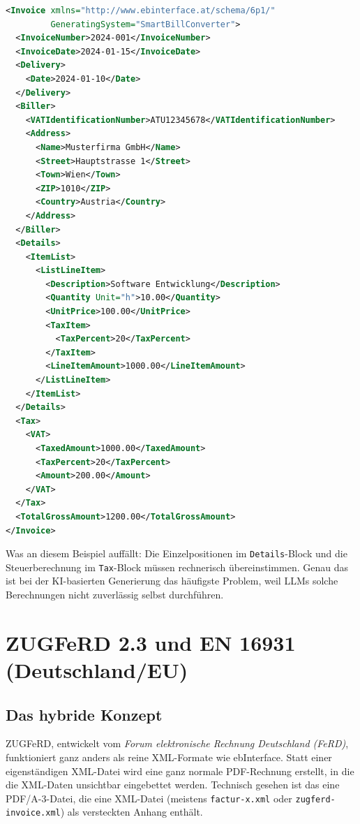 \begin{lstlisting}[language=XML, caption={Ausschnitt einer ebInterface 6.1 Rechnung}, label={lst:ebinterface_example}]
<Invoice xmlns="http://www.ebinterface.at/schema/6p1/" 
         GeneratingSystem="SmartBillConverter">
  <InvoiceNumber>2024-001</InvoiceNumber>
  <InvoiceDate>2024-01-15</InvoiceDate>
  <Delivery>
    <Date>2024-01-10</Date>
  </Delivery>
  <Biller>
    <VATIdentificationNumber>ATU12345678</VATIdentificationNumber>
    <Address>
      <Name>Musterfirma GmbH</Name>
      <Street>Hauptstrasse 1</Street>
      <Town>Wien</Town>
      <ZIP>1010</ZIP>
      <Country>Austria</Country>
    </Address>
  </Biller>
  <Details>
    <ItemList>
      <ListLineItem>
        <Description>Software Entwicklung</Description>
        <Quantity Unit="h">10.00</Quantity>
        <UnitPrice>100.00</UnitPrice>
        <TaxItem>
          <TaxPercent>20</TaxPercent>
        </TaxItem>
        <LineItemAmount>1000.00</LineItemAmount>
      </ListLineItem>
    </ItemList>
  </Details>
  <Tax>
    <VAT>
      <TaxedAmount>1000.00</TaxedAmount>
      <TaxPercent>20</TaxPercent>
      <Amount>200.00</Amount>
    </VAT>
  </Tax>
  <TotalGrossAmount>1200.00</TotalGrossAmount>
</Invoice>
\end{lstlisting}

Was an diesem Beispiel auffällt: Die Einzelpositionen im \texttt{Details}-Block und die Steuerberechnung im \texttt{Tax}-Block müssen rechnerisch übereinstimmen. Genau das ist bei der KI-basierten Generierung das häufigste Problem, weil LLMs solche Berechnungen nicht zuverlässig selbst durchführen.

\section{ZUGFeRD 2.3 und EN 16931 (Deutschland/EU)}
\label{sec:zugferd}

\subsection{Das hybride Konzept}
ZUGFeRD, entwickelt vom \textit{Forum elektronische Rechnung Deutschland (FeRD)}, funktioniert ganz anders als reine XML-Formate wie ebInterface. Statt einer eigenständigen XML-Datei wird eine ganz normale PDF-Rechnung erstellt, in die die XML-Daten unsichtbar eingebettet werden. Technisch gesehen ist das eine PDF/A-3-Datei, die eine XML-Datei (meistens \texttt{factur-x.xml} oder \texttt{zugferd-invoice.xml}) als versteckten Anhang enthält.

